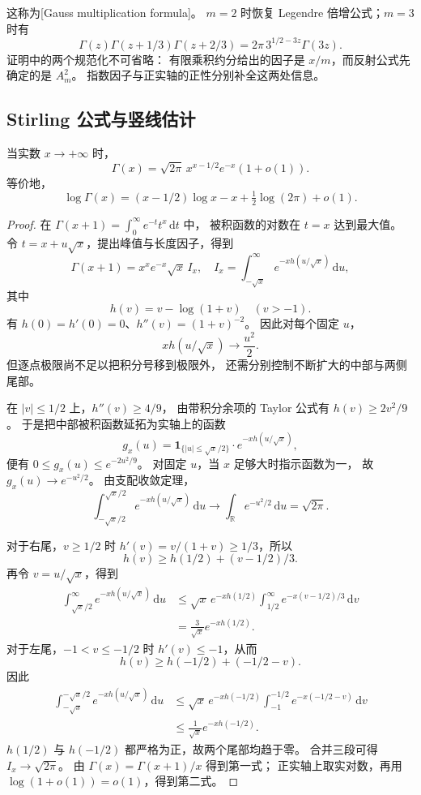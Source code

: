 这称为[Gauss multiplication formula]。
\(m=2\) 时恢复 Legendre 倍增公式；\(m=3\) 时有
\[
 \Gamma(z)\Gamma(z+1/3)\Gamma(z+2/3)
 =2\pi\,3^{1/2-3z}\Gamma(3z).
\]
证明中的两个规范化不可省略：
有限乘积约分给出的因子是 \(x/m\)，而反射公式先确定的是 \(A_m^2\)。
指数因子与正实轴的正性分别补全这两处信息。

\subsection{Stirling 公式与竖线估计}
\label{b3:subsec:210404}

\begin{theorem}[Stirling]\label{b3:thm:21-stirling}
当实数 \(x\to+\infty\) 时，
\[
 \Gamma(x)=\sqrt{2\pi}\,x^{x-1/2}e^{-x}(1+o(1)).
\]
等价地，
\[
 \log\Gamma(x)
 =(x-1/2)\log x-x+\tfrac12\log(2\pi)+o(1).
\]
\end{theorem}
\begin{proof}
在 \(\Gamma(x+1)=\int_0^\infty e^{-t}t^x\,\mathrm dt\) 中，
被积函数的对数在 \(t=x\) 达到最大值。
令 \(t=x+u\sqrt x\)，提出峰值与长度因子，得到
\[
 \Gamma(x+1)=x^xe^{-x}\sqrt x\,I_x,\quad
 I_x=\int_{-\sqrt x}^{\infty}e^{-xh(u/\sqrt x)}\,\mathrm du,
\]
其中
\[
 h(v)=v-\log(1+v)\quad(v>-1).
\]
有 \(h(0)=h'(0)=0\)、\(h''(v)=(1+v)^{-2}\)。
因此对每个固定 \(u\)，
\[
 xh(u/\sqrt x)\longrightarrow\frac{u^2}{2}.
\]
但逐点极限尚不足以把积分号移到极限外，
还需分别控制不断扩大的中部与两侧尾部。

在 \(|v|\le1/2\) 上，\(h''(v)\ge4/9\)，
由带积分余项的 Taylor 公式有 \(h(v)\ge2v^2/9\)。
于是把中部被积函数延拓为实轴上的函数
\[
 g_x(u)=\mathbf1_{\{|u|\le\sqrt x/2\}}
         \cdot e^{-xh(u/\sqrt x)},
\]
便有 \(0\le g_x(u)\le e^{-2u^2/9}\)。
对固定 \(u\)，当 \(x\) 足够大时指示函数为一，
故 \(g_x(u)\to e^{-u^2/2}\)。
由支配收敛定理，
\[
 \int_{-\sqrt x/2}^{\sqrt x/2}e^{-xh(u/\sqrt x)}\,\mathrm du
 \longrightarrow\int_{\mathbb R}e^{-u^2/2}\,\mathrm du
 =\sqrt{2\pi}.
\]

对于右尾，\(v\ge1/2\) 时
\(h'(v)=v/(1+v)\ge1/3\)，所以
\[
 h(v)\ge h(1/2)+(v-1/2)/3.
\]
再令 \(v=u/\sqrt x\)，得到
\[
 \begin{aligned}
 \int_{\sqrt x/2}^\infty e^{-xh(u/\sqrt x)}\,\mathrm du
 &\le\sqrt x\,e^{-xh(1/2)}
       \int_{1/2}^\infty e^{-x(v-1/2)/3}\,\mathrm dv\\
 &=\frac3{\sqrt x}e^{-xh(1/2)}.
 \end{aligned}
\]
对于左尾，\(-1<v\le-1/2\) 时 \(h'(v)\le-1\)，从而
\[
 h(v)\ge h(-1/2)+(-1/2-v).
\]
因此
\[
 \begin{aligned}
 \int_{-\sqrt x}^{-\sqrt x/2}e^{-xh(u/\sqrt x)}\,\mathrm du
 &\le\sqrt x\,e^{-xh(-1/2)}
       \int_{-1}^{-1/2}e^{-x(-1/2-v)}\,\mathrm dv\\
 &\le\frac1{\sqrt x}e^{-xh(-1/2)}.
 \end{aligned}
\]
\(h(1/2)\) 与 \(h(-1/2)\) 都严格为正，故两个尾部均趋于零。
合并三段可得 \(I_x\to\sqrt{2\pi}\)。
由 \(\Gamma(x)=\Gamma(x+1)/x\) 得到第一式；
正实轴上取实对数，再用 \(\log(1+o(1))=o(1)\)，得到第二式。
\end{proof}

